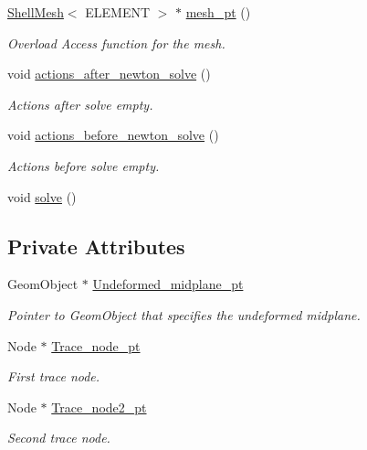 \begin{DoxyCompactItemize}
\hyperlink{classShellMesh}{Shell\+Mesh}$<$ E\+L\+E\+M\+E\+NT $>$ $\ast$ \hyperlink{classShellProblem_a1905a1b913469ed54f7c8f55d133ff57}{mesh\+\_\+pt} ()
\begin{DoxyCompactList}\small\item\em Overload Access function for the mesh. \end{DoxyCompactList}\item 
void \hyperlink{classShellProblem_a65636b791c99203ecbb09ba2a2eec214}{actions\+\_\+after\+\_\+newton\+\_\+solve} ()
\begin{DoxyCompactList}\small\item\em Actions after solve empty. \end{DoxyCompactList}\item 
void \hyperlink{classShellProblem_a379156a43ce05fe0e2dcf8a986a2ac64}{actions\+\_\+before\+\_\+newton\+\_\+solve} ()
\begin{DoxyCompactList}\small\item\em Actions before solve empty. \end{DoxyCompactList}\item 
void \hyperlink{classShellProblem_aa6d150bd1c137edbf4ded27ed044766d}{solve} ()
\end{DoxyCompactItemize}
\subsection*{Private Attributes}
\begin{DoxyCompactItemize}
\item 
Geom\+Object $\ast$ \hyperlink{classShellProblem_a1c9e4492c7c7c2716fdf8b812ec41651}{Undeformed\+\_\+midplane\+\_\+pt}
\begin{DoxyCompactList}\small\item\em Pointer to Geom\+Object that specifies the undeformed midplane. \end{DoxyCompactList}\item 
Node $\ast$ \hyperlink{classShellProblem_a45230216c4791c683218ff6d7f4ba9a0}{Trace\+\_\+node\+\_\+pt}
\begin{DoxyCompactList}\small\item\em First trace node. \end{DoxyCompactList}\item 
Node $\ast$ \hyperlink{classShellProblem_a1933abc1b3e5637e23fa2809eb1cd88f}{Trace\+\_\+node2\+\_\+pt}
\begin{DoxyCompactList}\small\item\em Second trace node. \end{DoxyCompactList}\end{DoxyCompactItemize}


